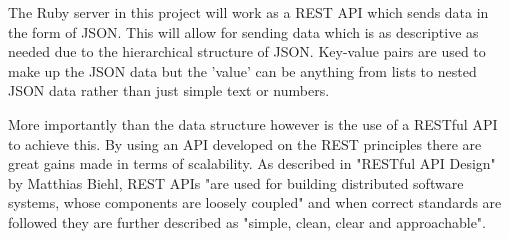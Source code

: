 The Ruby server in this project will work as a REST API which sends data in the form of JSON. This will allow for sending data which is as descriptive as needed due to the hierarchical structure of JSON. Key-value pairs are used to make up the JSON data but the 'value' can be anything from lists to nested JSON data rather than just simple text or numbers.

More importantly than the data structure however is the use of a RESTful API to achieve this. By using an API developed on the REST principles there are great gains made in terms of scalability. As described in "RESTful API Design"\cite{restfulapidesign} by Matthias Biehl, REST APIs "are used for building distributed software systems, whose components are loosely coupled"\cite{restfulapidesignbenefits} and when correct standards are followed they are further described as "simple, clean, clear and approachable"\cite{restfulapidesignbenefits}.